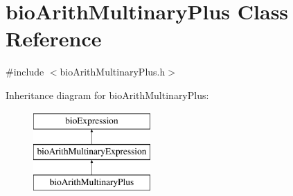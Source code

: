 \hypertarget{classbio_arith_multinary_plus}{}\section{bio\+Arith\+Multinary\+Plus Class Reference}
\label{classbio_arith_multinary_plus}


{\ttfamily \#include $<$bio\+Arith\+Multinary\+Plus.\+h$>$}

Inheritance diagram for bio\+Arith\+Multinary\+Plus\+:\begin{figure}[H]
\begin{center}
\leavevmode
\includegraphics[height=3.000000cm]{classbio_arith_multinary_plus}
\end{center}
\end{figure}
